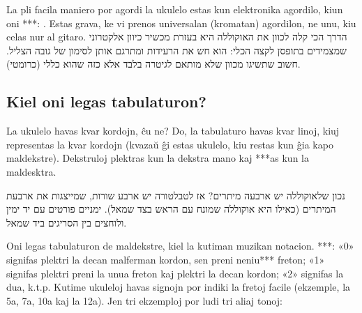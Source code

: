 La pli facila maniero por agordi la ukulelo estas kun elektronika agordilo, kiun oni ***: . Estas grava, ke vi prenos universalan (kromatan) agordilon, ne unu, kiu celas nur al gitaro.
הדרך הכי קלה לכוון את האוקוללה היא בעזרת מכשיר כיוון אלקטרוני שמצמידים בתופסן לקצה הכלי: הוא חש את הרעידות ומתרגם אותן לסימון של גובה הצליל. חשוב שתשיגו מכוון שלא מותאם לגיטרה בלבד אלא כזה שהוא כללי (כרומטי).



\subsection*{Kiel oni legas tabulaturon?}

La ukulelo havas kvar kordojn, ĉu ne? Do, la tabulaturo havas kvar linoj, kiuj representas la kvar kordojn (kvazaŭ ĝi estas ukulelo, kiu restas kun ĝia kapo maldekstre). Dekstruloj plektras kun la dekstra mano kaj ***as kun la maldesktra.

נכון שלאוקוללה יש ארבעה מיתרים? אז לטבלטורה יש ארבע שורות, שמייצגות את ארבעת המיתרים (כאילו היא אוקוללה שמונח עם הראש בצד שמאל). ימניים פורטים עם יד ימין ולוחצים בין הסריגים ביד שמאל.

Oni legas tabulaturon de maldekstre, kiel la kutiman muzikan notacion. ***: «0» signifas plektri la decan malferman kordon, sen preni neniu*** freton; «1» signifas plektri preni la unua freton kaj plektri la decan kordon; «2» signifas la dua, k.t.p. Kutime ukuleloj havas signojn por indiki la fretoj facile (ekzemple, la 5a, 7a, 10a kaj la 12a). Jen tri ekzemploj por ludi tri aliaj tonoj:

